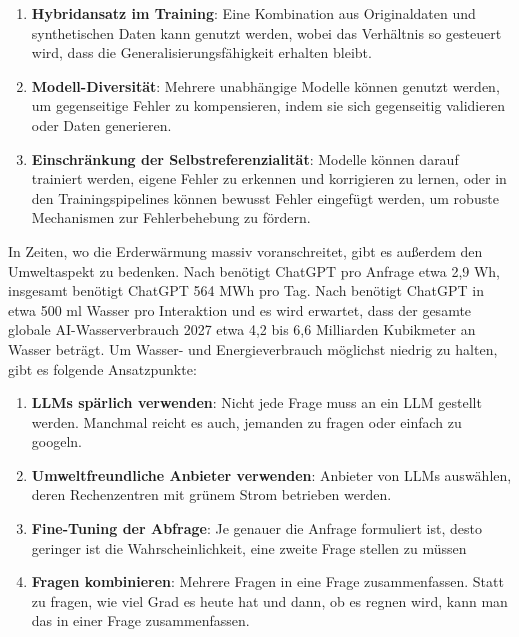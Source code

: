 \documentclass[12pt]{article}
\begin{document}
\begin{enumerate}
    \item \textbf{Hybridansatz im Training}: Eine Kombination aus Originaldaten und synthetischen Daten kann genutzt werden, wobei das Verhältnis so gesteuert wird, dass die Generalisierungsfähigkeit erhalten bleibt.
    \item \textbf{Modell-Diversität}: Mehrere unabhängige Modelle können genutzt werden, um gegenseitige Fehler zu kompensieren, indem sie sich gegenseitig validieren oder Daten generieren.
    \item \textbf{Einschränkung der Selbstreferenzialität}: Modelle können darauf trainiert werden, eigene Fehler zu erkennen und korrigieren zu lernen, oder in den Trainingspipelines können bewusst Fehler eingefügt werden, um robuste Mechanismen zur Fehlerbehebung zu fördern.
\end{enumerate}

In Zeiten, wo die Erderwärmung massiv voranschreitet, gibt es außerdem den Umweltaspekt zu bedenken. Nach \cite{energyUsage} benötigt ChatGPT pro Anfrage etwa 2,9 Wh, insgesamt benötigt ChatGPT 564 MWh pro Tag. Nach \cite{waterUsage} benötigt ChatGPT in etwa 500 ml Wasser pro Interaktion und es wird erwartet, dass der gesamte globale AI-Wasserverbrauch 2027 etwa 4,2 bis 6,6 Milliarden Kubikmeter an Wasser beträgt. Um Wasser- und Energieverbrauch möglichst niedrig zu halten, gibt es folgende Ansatzpunkte:

\begin{enumerate}
    \item \textbf{LLMs spärlich verwenden}: Nicht jede Frage muss an ein LLM gestellt werden. Manchmal reicht es auch, jemanden zu fragen oder einfach zu googeln. 
    \item \textbf{Umweltfreundliche Anbieter verwenden}: Anbieter von LLMs auswählen, deren Rechenzentren mit grünem Strom betrieben werden.
    \item \textbf{Fine-Tuning der Abfrage}: Je genauer die Anfrage formuliert ist, desto geringer ist die Wahrscheinlichkeit, eine zweite Frage stellen zu müssen
    \item \textbf{Fragen kombinieren}: Mehrere Fragen in eine Frage zusammenfassen. Statt zu fragen, wie viel Grad es heute hat und dann, ob es regnen wird, kann man das in einer Frage zusammenfassen.
\end{enumerate}



\end{document}
